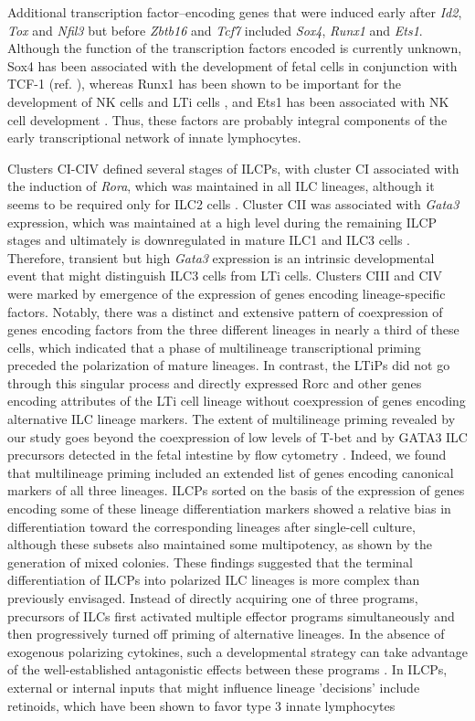 Additional transcription factor–encoding genes that were induced early after \textit{Id2}, \textit{Tox} and \textit{Nfil3} but before \textit{Zbtb16} and \textit{Tcf7} included \textit{Sox4}, \textit{Runx1} and \textit{Ets1}. Although the function of the transcription factors encoded is currently unknown, Sox4 has been associated with the development of fetal \gdT cells in conjunction with TCF-1 (ref. \cite{malhotra2013}), whereas Runx1 has been shown to be important for the development of NK cells and LTi cells \cite{tachibana2011}, and Ets1 has been associated with NK cell development \cite{ramirez2012}. Thus, these factors are probably integral components of the early transcriptional network of innate lymphocytes.

Clusters CI-CIV defined several stages of ILCPs, with cluster CI associated with the induction of \textit{Rora}, which was maintained in all ILC lineages, although it seems to be required only for ILC2 cells \cite{wong2012,halim2012}. Cluster CII was associated with \textit{Gata3} expression, which was maintained at a high level during the remaining ILCP stages and ultimately is downregulated in mature ILC1 and ILC3 cells \cite{constantinides2014}. Therefore, transient but high \textit{Gata3} expression is an intrinsic developmental event that might distinguish ILC3 cells from LTi cells. Clusters CIII and CIV were marked by emergence of the expression of genes encoding lineage-specific factors. Notably, there was a distinct and extensive pattern of coexpression of genes encoding factors from the three different lineages in nearly a third of these cells, which indicated that a phase of multilineage transcriptional priming preceded the polarization of mature lineages. In contrast, the LTiPs did not go through this singular process and directly expressed Rorc and other genes encoding attributes of the LTi cell lineage without coexpression of genes encoding alternative ILC lineage markers. The extent of multilineage priming revealed by our study goes beyond the coexpression of low levels of T-bet and \RORgt{} by GATA3\UP{} ILC precursors detected in the fetal intestine by flow cytometry \cite{bando2015}. Indeed, we found that multilineage priming included an extended list of genes encoding canonical markers of all three lineages. ILCPs sorted on the basis of the expression of genes encoding some of these lineage differentiation markers showed a relative bias in differentiation toward the corresponding lineages after single-cell culture, although these subsets also maintained some multipotency, as shown by the generation of mixed colonies. These findings suggested that the terminal differentiation of ILCPs into polarized ILC lineages is more complex than previously envisaged. Instead of directly acquiring one of three programs, precursors of ILCs first activated multiple effector programs simultaneously and then progressively turned off priming of alternative lineages. In the absence of exogenous polarizing cytokines, such a developmental strategy can take advantage of the well-established antagonistic effects between these programs \cite{zhu2010}. In ILCPs, external or internal inputs that might influence lineage 'decisions' include retinoids, which have been shown to favor type 3 innate lymphocytes 